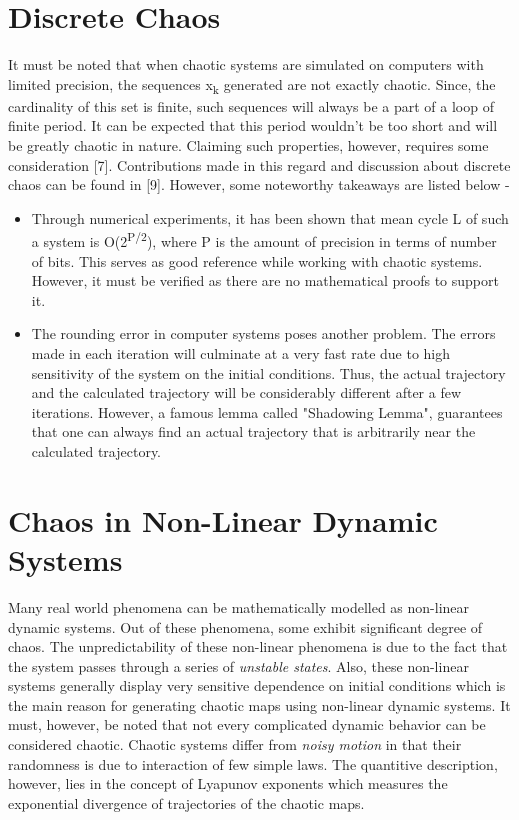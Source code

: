 \section{Discrete Chaos}
It must be noted that when chaotic systems are simulated on computers with limited precision, the sequences x\textsubscript{k} generated are not exactly chaotic. Since, the cardinality of this set is finite, such sequences will always be a part of a loop of finite period. It can be expected that this period wouldn't be too short and will be greatly chaotic in nature. Claiming such properties, however, requires some consideration [7]. Contributions made in this regard and discussion about discrete chaos can be found in [9]. However, some noteworthy takeaways are listed below -
\begin{itemize}
\item Through numerical experiments, it has been shown that mean cycle L of such a system is O(2\textsuperscript{P/2}), where P is the amount of precision in terms of number of bits. This serves as good reference while working with chaotic systems. However, it must be verified as there are no mathematical proofs to support it.
\item The rounding error in computer systems poses another problem. The errors made in each iteration will culminate at a very fast rate due to high sensitivity of the system on the initial conditions. Thus, the actual trajectory and the calculated trajectory will be considerably different after a few iterations. However, a famous lemma called "Shadowing Lemma", guarantees that one can always find an actual trajectory that is arbitrarily near the calculated trajectory.
\end{itemize}

\section{Chaos in Non-Linear Dynamic Systems}
Many real world phenomena can be mathematically modelled as non-linear dynamic systems. Out of these phenomena, some exhibit significant degree of chaos. The unpredictability of these non-linear phenomena is due to the fact that the system passes through a series of {\em unstable states}. Also, these non-linear systems generally display very sensitive dependence on initial conditions which is the main reason for generating chaotic maps using non-linear dynamic systems. It must, however, be noted that not every complicated dynamic behavior can be considered chaotic. Chaotic systems differ from {\em noisy motion} in that their randomness is due to interaction of few simple laws. The quantitive description, however, lies in the concept of Lyapunov exponents which measures the exponential divergence of trajectories of the chaotic maps. 

